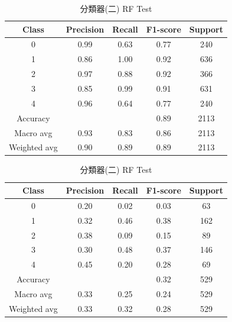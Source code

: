 \begin{enumerate}
\begin{enumerate}
                \begin{table}[H]
                \centering
                \scriptsize
                \begin{minipage}{0.48\textwidth}
                \centering
                \begin{tabular}{c|cccc}
                \hline
                Class & Precision & Recall & F1-score & Support \\
                \hline
                0 & 0.99 & 0.63 & 0.77 & 240 \\
                1 & 0.86 & 1.00 & 0.92 & 636 \\
                2 & 0.97 & 0.88 & 0.92 & 366 \\
                3 & 0.85 & 0.99 & 0.91 & 631 \\
                4 & 0.96 & 0.64 & 0.77 & 240 \\
                \hline
                Accuracy &       &       & 0.89 & 2113 \\
                Macro avg & 0.93 & 0.83 & 0.86 & 2113 \\
                Weighted avg & 0.90 & 0.89 & 0.89 & 2113 \\
                \hline
                \end{tabular}
                \caption{分類器(二) RF Train}
                \label{tab:classifier_2_report_train_sgd_rf_filtered}
                \end{minipage}%
                \hfill
                \begin{minipage}{0.48\textwidth}
                \centering
                \begin{tabular}{c|cccc}
                \hline
                Class & Precision & Recall & F1-score & Support \\
                \hline
                0 & 0.20 & 0.02 & 0.03 & 63 \\
                1 & 0.32 & 0.46 & 0.38 & 162 \\
                2 & 0.38 & 0.09 & 0.15 & 89 \\
                3 & 0.30 & 0.48 & 0.37 & 146 \\
                4 & 0.45 & 0.20 & 0.28 & 69 \\
                \hline
                Accuracy &       &       & 0.32 & 529 \\
                Macro avg & 0.33 & 0.25 & 0.24 & 529 \\
                Weighted avg & 0.33 & 0.32 & 0.28 & 529 \\
                \hline
                \end{tabular}
                \caption{分類器(二) RF Test}
                \label{tab:classifier_2_report_test_sgd_rf_filtered}
                \end{minipage}
                \end{table}



\end{enumerate}
\end{enumerate}
